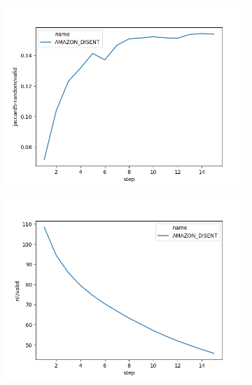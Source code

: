 \begin{figure}[h]
    \centering
    \begin{subfigure}{0.3\textheight}
        \centering
        \includegraphics[width=1.\textwidth]{images/figs2/2020_01_15__11_42_11__jaccard5-random.png}
        \caption{}
        \label{fig:chap4:amazon_disent_jaccard}
    \end{subfigure}
    \begin{subfigure}{0.3\textheight}
        \centering
        \includegraphics[width=1.\textwidth]{images/figs2/2020_01_15__11_42_11__nll.png}
        \caption{}
        \label{fig:chap4:amazon_disent_nll}
    \end{subfigure}
    \begin{subfigure}{0.3\textheight}

\end{subfigure}
\end{figure}
